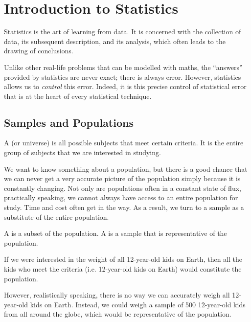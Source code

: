 \chapter{Introduction to Statistics}

Statistics is the art of learning from data. It is concerned with the collection of data, its subsequent description, and its analysis, which often leads to the drawing of conclusions. 

Unlike other real-life problems that can be modelled with maths, the ``answers'' provided by statistics are never exact; there is always error. However, statistics allows us to \emph{control} this error. Indeed, it is this precise control of statistical error that is at the heart of every statistical technique.

\section{Samples and Populations}

\begin{definition}
    A  (or universe) is all possible subjects that meet certain criteria. It is the entire group of subjects that we are interested in studying.
\end{definition}

We want to know something about a population, but there is a good chance that we can never get a very accurate picture of the population simply because it is constantly changing. Not only are populations often in a constant state of flux, practically speaking, we cannot always have access to an entire population for study. Time and cost often get in the way. As a result, we turn to a sample as a substitute of the entire population.

\begin{definition}
    A  is a subset of the population. A  is a sample that is representative of the population.
\end{definition}

\begin{example}
    If we were interested in the weight of all 12-year-old kids on Earth, then all the kids who meet the criteria (i.e. 12-year-old kids on Earth) would constitute the population.

    However, realistically speaking, there is no way we can accurately weigh all 12-year-old kids on Earth. Instead, we could weigh a sample of 500 12-year-old kids from all around the globe, which would be representative of the population.
\end{example}

